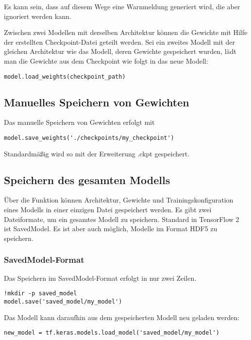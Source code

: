 Es kann sein, dass auf diesem Wege eine Warnmeldung generiert wird, die aber ignoriert werden kann.

Zwischen zwei Modellen mit derselben Architektur können die Gewichte mit Hilfe der erstellten Checkpoint-Datei geteilt werden.
Sei  ein zweites Modell mit der gleichen Architektur wie das Modell, deren Gewichte gespeichert wurden,
lädt man die Gewichte aus dem Checkpoint wie folgt in das neue Modell:

\begin{verbatim}
model.load_weights(checkpoint_path)
\end{verbatim}

\subsection{Manuelles Speichern von Gewichten}
Das manuelle Speichern von Gewichten erfolgt mit
\begin{verbatim}
model.save_weights('./checkpoints/my_checkpoint')
\end{verbatim}
Standardmäßig wird so mit der Erweiterung .ckpt gespeichert.

\subsection{Speichern des gesamten Modells}

Über die Funktion  können Architektur, Gewichte und Trainingskonfiguration eines Modells in einer einzigen Datei gespeichert werden. 
Es gibt zwei Dateiformate, um ein gesamtes Modell zu speichern. Standard in TensorFlow 2 ist SavedModel. Es ist aber auch möglich, Modelle
im Format HDF5 zu speichern.

  

\subsubsection{SavedModel-Format}
Das Speichern im SavedModel-Format erfolgt in nur zwei Zeilen.

\begin{verbatim}
!mkdir -p saved_model
model.save('saved_model/my_model')
\end{verbatim}

Das Modell kann daraufhin aus dem gespeicherten Modell neu geladen werden:

\begin{verbatim}
new_model = tf.keras.models.load_model('saved_model/my_model')
\end{verbatim}

